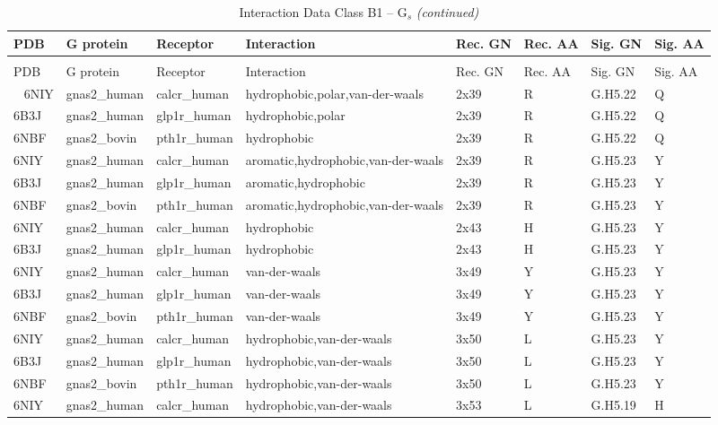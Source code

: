 
\begin{landscape}
\begin{longtable}{llllllll}
\caption{\label{tab:interaction-data-b1-gs}Interaction Data Class B1 – G$_{s}$}\\
\toprule
PDB & G protein & Receptor & Interaction & Rec. GN & Rec. AA & Sig. GN & Sig. AA\\
\midrule
\endfirsthead
\caption[]{Interaction Data Class B1 – G$_{s}$ \textit{(continued)}}\\
\toprule
PDB & G protein & Receptor & Interaction & Rec. GN & Rec. AA & Sig. GN & Sig. AA\\
\midrule
\endhead
\
\endfoot
\bottomrule
\endlastfoot
6NIY & gnas2\_human & calcr\_human & hydrophobic,polar,van-der-waals & 2x39 & R & G.H5.22 & Q\\
6B3J & gnas2\_human & glp1r\_human & hydrophobic,polar & 2x39 & R & G.H5.22 & Q\\
6NBF & gnas2\_bovin & pth1r\_human & hydrophobic & 2x39 & R & G.H5.22 & Q\\
6NIY & gnas2\_human & calcr\_human & aromatic,hydrophobic,van-der-waals & 2x39 & R & G.H5.23 & Y\\
6B3J & gnas2\_human & glp1r\_human & aromatic,hydrophobic & 2x39 & R & G.H5.23 & Y\\
\addlinespace
6NBF & gnas2\_bovin & pth1r\_human & aromatic,hydrophobic,van-der-waals & 2x39 & R & G.H5.23 & Y\\
6NIY & gnas2\_human & calcr\_human & hydrophobic & 2x43 & H & G.H5.23 & Y\\
6B3J & gnas2\_human & glp1r\_human & hydrophobic & 2x43 & H & G.H5.23 & Y\\
6NIY & gnas2\_human & calcr\_human & van-der-waals & 3x49 & Y & G.H5.23 & Y\\
6B3J & gnas2\_human & glp1r\_human & van-der-waals & 3x49 & Y & G.H5.23 & Y\\
\addlinespace
6NBF & gnas2\_bovin & pth1r\_human & van-der-waals & 3x49 & Y & G.H5.23 & Y\\
6NIY & gnas2\_human & calcr\_human & hydrophobic,van-der-waals & 3x50 & L & G.H5.23 & Y\\
6B3J & gnas2\_human & glp1r\_human & hydrophobic,van-der-waals & 3x50 & L & G.H5.23 & Y\\
6NBF & gnas2\_bovin & pth1r\_human & hydrophobic,van-der-waals & 3x50 & L & G.H5.23 & Y\\
6NIY & gnas2\_human & calcr\_human & hydrophobic,van-der-waals & 3x53 & L & G.H5.19 & H\\

\end{longtable}
\end{landscape}
